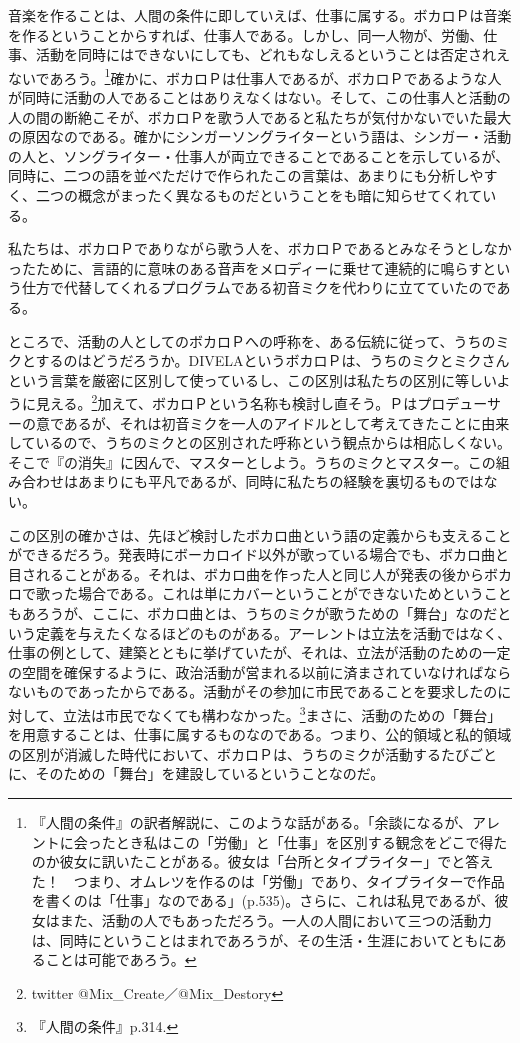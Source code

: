 \documentclass[b5j,twoside,twocolumn]{utarticle}
\begin{document}
音楽を作ることは、人間の条件に即していえば、仕事に属する。ボカロＰは音楽を作るということからすれば、仕事人である。しかし、同一人物が、労働、仕事、活動を同時にはできないにしても、どれもなしえるということは否定されえないであろう。\footnote{『人間の条件』の訳者解説に、このような話がある。「余談になるが、アレントに会ったとき私はこの「労働」と「仕事」を区別する観念をどこで得たのか彼女に訊いたことがある。彼女は「台所とタイプライター」でと答えた！　つまり、オムレツを作るのは「労働」であり、タイプライターで作品を書くのは「仕事」なのである」(p.535)。さらに、これは私見であるが、彼女はまた、活動の人でもあっただろう。一人の人間において三つの活動力は、同時にということはまれであろうが、その生活・生涯においてともにあることは可能であろう。}確かに、ボカロＰは仕事人であるが、ボカロＰであるような人が同時に活動の人であることはありえなくはない。そして、この仕事人と活動の人の間の断絶こそが、ボカロＰを歌う人であると私たちが気付かないでいた最大の原因なのである。確かにシンガーソングライターという語は、シンガー・活動の人と、ソングライター・仕事人が両立できることであることを示しているが、同時に、二つの語を並べただけで作られたこの言葉は、あまりにも分析しやすく、二つの概念がまったく異なるものだということをも暗に知らせてくれている。


私たちは、ボカロＰでありながら歌う人を、ボカロＰであるとみなそうとしなかったために、言語的に意味のある音声をメロディーに乗せて連続的に鳴らすという仕方で代替してくれるプログラムである初音ミクを代わりに立てていたのである。


ところで、活動の人としてのボカロＰへの呼称を、ある伝統に従って、うちのミクとするのはどうだろうか。DIVELAというボカロＰは、うちのミクとミクさんという言葉を厳密に区別して使っているし、この区別は私たちの区別に等しいように見える。\footnote{twitter @Mix\_Create／@Mix\_Destory}加えて、ボカロＰという名称も検討し直そう。Ｐはプロデューサーの意であるが、それは初音ミクを一人のアイドルとして考えてきたことに由来しているので、うちのミクとの区別された呼称という観点からは相応しくない。そこで『の消失』に因んで、マスターとしよう。うちのミクとマスター。この組み合わせはあまりにも平凡であるが、同時に私たちの経験を裏切るものではない。


この区別の確かさは、先ほど検討したボカロ曲という語の定義からも支えることができるだろう。発表時にボーカロイド以外が歌っている場合でも、ボカロ曲と目されることがある。それは、ボカロ曲を作った人と同じ人が発表の後からボカロで歌った場合である。これは単にカバーということができないためということもあろうが、ここに、ボカロ曲とは、うちのミクが歌うための「舞台」なのだという定義を与えたくなるほどのものがある。アーレントは立法を活動ではなく、仕事の例として、建築とともに挙げていたが、それは、立法が活動のための一定の空間を確保するように、政治活動が営まれる以前に済まされていなければならないものであったからである。活動がその参加に市民であることを要求したのに対して、立法は市民でなくても構わなかった。\footnote{『人間の条件』p.314.}まさに、活動のための「舞台」を用意することは、仕事に属するものなのである。つまり、公的領域と私的領域の区別が消滅した時代において、ボカロＰは、うちのミクが活動するたびごとに、そのための「舞台」を建設しているということなのだ。
\end{document}
